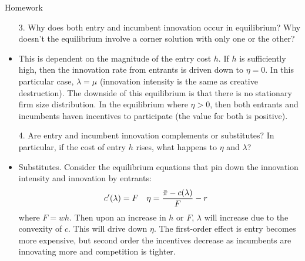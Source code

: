 \documentclass[usenames,dvipsnames,aspectratio=169]{beamer}
\begin{document}
\begin{frame}[allowframebreaks]{Homework}
\begin{itemize}
        \item[3.] Why does both entry and incumbent innovation occur in equilibrium?  Why doesn't the equilibrium involve a corner solution with only one or the other? \\ 
        \item This is dependent on the magnitude of the entry cost $h$. If $h$ is sufficiently high, then the innovation rate from entrants is driven down to $\eta=0$. In this particular case, $\lambda=\mu$ (innovation intensity is the same as creative destruction). The downside of this equilibrium is that there is no stationary firm size distribution. In the equilibrium where $\eta>0$, then both entrants and incumbents haven incentives to participate (the value for both is positive).
         \vspace{40pt}
        \framebreak
        \item[4.] Are entry and incumbent innovation complements or substitutes?  In particular, if the cost of entry $h$ rises, what happens to $\eta$ and $\lambda$? \\ 
        \item Substitutes. Consider the equilibrium equations that  pin down the innovation intensity and innovation by entrants:
        \begin{align*}
            c'(\lambda) &= F & \eta &= \frac{\Bar{\pi}-c(\lambda)}{F}-r
        \end{align*}
        where $F=wh$. Then upon an increase in $h$ or $F$, $\lambda$ will increase due to the convexity of $c$. This will drive down $\eta$. The first-order effect is entry becomes more expensive, but second order the incentives decrease as incumbents are innovating more and competition is tighter. 
    \end{itemize}
\end{frame}
\end{document}
